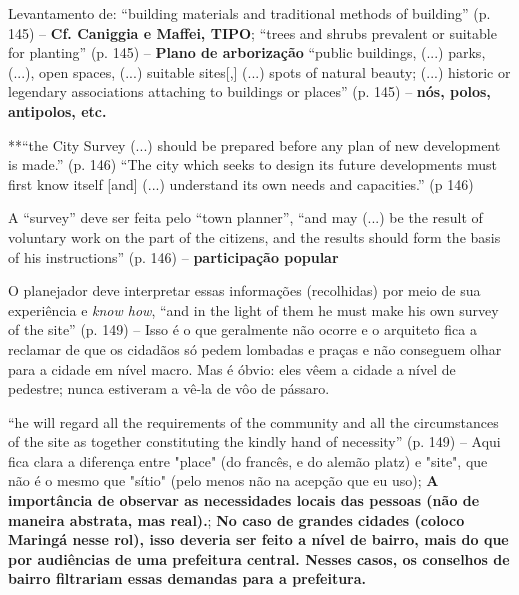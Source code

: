 \documentclass[12pt, a4paper]{book} %
\begin{document}
        Levantamento de: ``building materials and traditional methods of building'' (p. 145) – \textbf{Cf. Caniggia e Maffei, TIPO}; 
        ``trees and shrubs prevalent or suitable for planting'' (p. 145) – \textbf{Plano de arborização}
        ``public buildings, (...) parks, (...), open spaces, (...) suitable sites[,] (...) spots of natural beauty; (...) historic or legendary associations attaching to buildings or places'' (p. 145) – \textbf{nós, polos, antipolos, etc.}

        **``the City Survey (...) should be prepared before any plan of new development is made.'' (p. 146)
        ``The city which seeks to design its future developments must first know itself [and] (...) understand its own needs and capacities.'' (p 146)

        A ``survey'' deve ser feita pelo ``town planner'', ``and may (...) be the result of voluntary work on the part of the citizens, and the results should form the basis of his instructions'' (p. 146) – \textbf{participação popular}

        O planejador deve interpretar essas informações (recolhidas) por meio de sua experiência e \textit{know how}, ``and in the light of them he must make his own survey of the site'' (p. 149) – Isso é o que geralmente não ocorre e o arquiteto fica a reclamar de que os cidadãos só pedem lombadas e praças e não conseguem olhar para a cidade em nível macro. Mas é óbvio: eles vêem a cidade a nível de pedestre; nunca estiveram a vê-la de vôo de pássaro.

        ``he will regard all the requirements of the community and all the circumstances of the site as together constituting the kindly hand of necessity'' (p. 149) – Aqui fica clara a diferença entre "place" (do francês, e do alemão platz) e "site", que não é o mesmo que "sítio" (pelo menos não na acepção que eu uso); \textbf{A importância de observar as necessidades locais das pessoas (não de maneira abstrata, mas real).}; \textbf{No caso de grandes cidades (coloco Maringá nesse rol), isso deveria ser feito a nível de bairro, mais do que por audiências de uma prefeitura central. Nesses casos, os conselhos de bairro filtrariam essas demandas para a prefeitura.}
\end{document}
